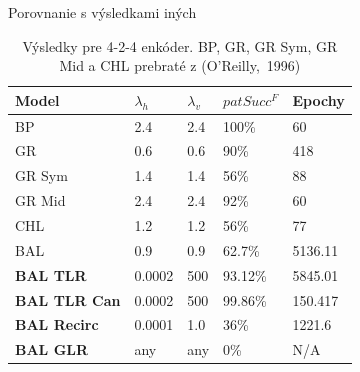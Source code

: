 \documentclass[xcolor=dvipsnames]{beamer}
\begin{document}
\begin{frame}{Porovnanie s výsledkami iných}
  \begin{table}[H] 
    \centering
      \begin{tabular}{|l|l|l|l|l|}
      \hline
      Model &$\lambda_h$&$\lambda_v$&$patSucc^F$ &Epochy\\ %
      \hline
      BP&2.4 &2.4 &100\%&60\\ %
      \hline
      GR&0.6 &0.6 &90\%&418\\ %
      \hline
      GR Sym&1.4 &1.4 &56\%&88\\ %
      \hline
      GR Mid&2.4 &2.4 &92\%&60\\ %
      \hline
      CHL&1.2 &1.2 &56\%&77\\ %
      \hline
      BAL&0.9 &0.9 &62.7\%& 5136.11\\ %
      \hline
      {\bf BAL TLR}&0.0002  & 500&93.12\%&5845.01\\ %
      \hline
      {\bf BAL TLR Can}&0.0002&500&99.86\%&150.417\\ %
      \hline
      {\bf BAL Recirc}&0.0001&1.0&36\%&1221.6\\ %
      \hline
      {\bf BAL GLR}& any & any & 0\% & N/A \\
      \hline 
      \end{tabular}
    \caption{Výsledky pre 4-2-4 enkóder. BP, GR, GR Sym, GR Mid a CHL prebraté z (O'Reilly,~1996)} 
  \label{tab:results-cmp-auto4}
\end{table}
\end{frame}
\end{document}
